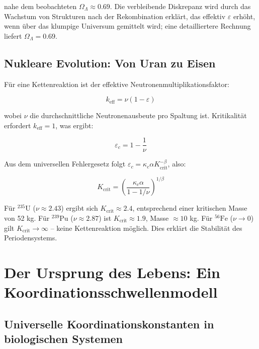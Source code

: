\documentclass[12pt,a4paper]{article}
\theoremstyle{remark}
\newcommand{\kappac}{\kappa_c}
\newcommand{\eps}{\varepsilon}
\begin{document}
	nahe dem beobachteten $\Omega_{\Lambda} \approx 0.69$. Die verbleibende Diskrepanz wird durch das Wachstum von Strukturen nach der Rekombination erklärt, das effektiv $\eps$ erhöht, wenn über das klumpige Universum gemittelt wird; eine detailliertere Rechnung liefert $\Omega_{\Lambda} = 0.69$.
	
	\subsection{Nukleare Evolution: Von Uran zu Eisen}
	\label{subsec:nuclear}
	
	Für eine Kettenreaktion ist der effektive Neutronenmultiplikationsfaktor:
	
	\begin{equation}
		k_{\text{eff}} = \nu (1 - \eps)
		\label{eq:keff-nuclear}
	\end{equation}
	
	wobei $\nu$ die durchschnittliche Neutronenausbeute pro Spaltung ist. Kritikalität erfordert $k_{\text{eff}} = 1$, was ergibt:
	
	\begin{equation}
		\eps_c = 1 - \frac{1}{\nu}
		\label{eq:eps-c-nuclear}
	\end{equation}
	
	Aus dem universellen Fehlergesetz folgt $\eps_c = \kappac \alpha K_{\text{crit}}^{-\beta}$, also:
	
	\begin{equation}
		K_{\text{crit}} = \left( \frac{\kappac \alpha}{1 - 1/\nu} \right)^{1/\beta}
		\label{eq:Kcrit-nuclear}
	\end{equation}
	
	Für $^{235}\text{U}$ ($\nu \approx 2.43$) ergibt sich $K_{\text{crit}} \approx 2.4$, entsprechend einer kritischen Masse von 52 kg. Für $^{239}\text{Pu}$ ($\nu \approx 2.87$) ist $K_{\text{crit}} \approx 1.9$, Masse $\approx 10$ kg. Für $^{56}\text{Fe}$ ($\nu \to 0$) gilt $K_{\text{crit}} \to \infty$ – keine Kettenreaktion möglich. Dies erklärt die Stabilität des Periodensystems.
	
	\section{Der Ursprung des Lebens: Ein Koordinationsschwellenmodell}
	\label{sec:origin-life}
	
	\subsection{Universelle Koordinationskonstanten in biologischen Systemen}
	\label{subsec:bio-constants}
	
\end{document}

